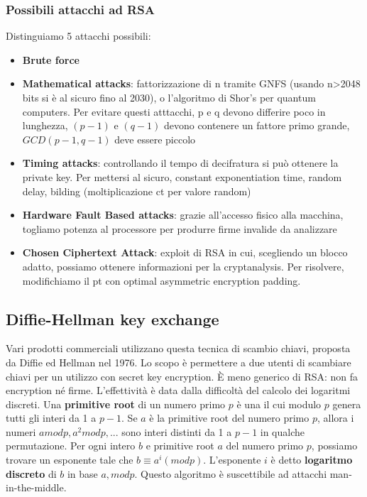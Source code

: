 \documentclass[11pt]{article}
\begin{document}
\subsubsection{Possibili attacchi ad RSA}
Distinguiamo 5 attacchi possibili:
\begin{itemize}
    \item \textbf{Brute force}
    \item \textbf{Mathematical attacks}: fattorizzazione di n tramite GNFS (usando n>2048 bits si è al sicuro fino al 2030), o l'algoritmo di Shor's per quantum computers. Per evitare questi atttacchi, p e q devono differire poco in lunghezza, $(p-1)$ e $(q-1)$ devono contenere un fattore primo grande, $GCD(p-1,q-1)$ deve essere piccolo
    \item \textbf{Timing attacks}: controllando il tempo di decifratura si può ottenere la private key. Per mettersi al sicuro, constant exponentiation time, random delay, bilding (moltiplicazione ct per valore random)
    \item \textbf{Hardware Fault Based attacks}: grazie all'accesso fisico alla macchina, togliamo potenza al processore per produrre firme invalide da analizzare
    \item \textbf{Chosen Ciphertext Attack}: exploit di RSA in cui, scegliendo un blocco adatto, possiamo ottenere informazioni per la cryptanalysis. Per risolvere, modifichiamo il pt con optimal asymmetric encryption padding.
\end{itemize}

\subsection{Diffie-Hellman key exchange}
Vari prodotti commerciali utilizzano questa tecnica di scambio chiavi, proposta da Diffie ed Hellman nel 1976. Lo scopo è permettere a due utenti di scambiare chiavi per un utilizzo con secret key encryption. È meno generico di RSA: non fa encryption né firme. L'effettività è data dalla difficoltà del calcolo dei logaritmi discreti.
Una \textbf{primitive root} di un numero primo $p$ è una il cui modulo $p$ genera tutti gli interi da 1 a $p-1$.
Se $a$ è la primitive root del numero primo $p$, allora i numeri $a mod p, a^2 mod p,...$ sono interi distinti da 1 a $p-1$ in qualche permutazione. Per ogni intero $b$ e primitive root $a$ del numero primo $p$, possiamo trovare un esponente tale che $b \equiv a^i (mod p)$. L'esponente $i$ è detto \textbf{logaritmo discreto} di $b$ in base $a, mod p$.
Questo algoritmo è suscettibile ad attacchi man-in-the-middle.
\end{document}
